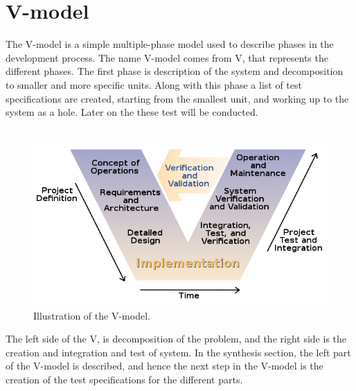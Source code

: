 \section{V-model}

%
%
%
%
%
%
%
%
%
%
%
%
%
%
%
The V-model is a simple multiple-phase model used to describe phases in the development process. 
The name V-model comes from V, that represents the different phases.
The first phase is description of the system and decomposition to smaller and more specific units.
Along with this phase a list of test specifications are created, starting from the smallest unit, and working up to the system as a hole.
Later on the these test will be conducted.
\\\\
\begin{figure}
\centering
\includegraphics[scale=0.5]{figures/20170215_V-model_image.png}
\caption{Illustration of the V-model. \cite{V-modelwiki}} 
\end{figure}
The left side of the V, is decomposition of the problem, and the right side is the creation and integration and test of system.
In the synthesis section, the left part of the V-model is described, and hence the next step in the V-model is the creation of the test specifications for the different parts.



